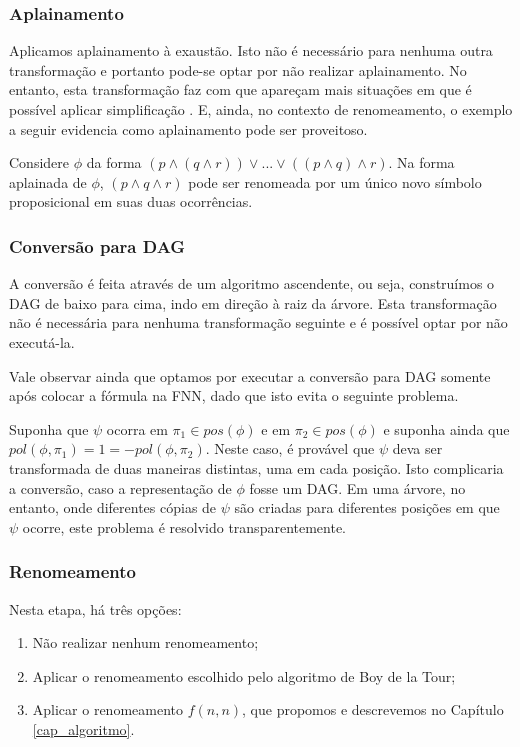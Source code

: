 \subsubsection{Aplainamento}

\indent

Aplicamos aplainamento à exaustão. Isto não é necessário para nenhuma outra transformação e portanto pode-se optar por não realizar aplainamento. No entanto, esta transformação faz com que apareçam mais situações em que é possível aplicar simplificação \cite{sebastiani2009automated}. E, ainda, no contexto de renomeamento, o exemplo a seguir evidencia como aplainamento pode ser proveitoso.

Considere $\phi$ da forma $(p \wedge (q \wedge r)) \vee ... \vee ((p \wedge q) \wedge r)$. Na forma aplainada de $\phi$, $(p \wedge q \wedge r)$ pode ser renomeada por um único novo símbolo proposicional em suas duas ocorrências.

\subsubsection{Conversão para DAG}

\indent

A conversão é feita através de um algoritmo ascendente, ou seja, construímos o DAG de baixo para cima, indo em direção à raiz da árvore. Esta transformação não é necessária para nenhuma transformação seguinte e é possível optar por não executá-la.

Vale observar ainda que optamos por executar a conversão para DAG somente após colocar a fórmula na FNN, dado que isto evita o seguinte problema.

Suponha que $\psi$ ocorra em $\pi_1 \in pos(\phi)$ e em $\pi_2 \in pos(\phi)$ e suponha ainda que $pol(\phi,\pi_1) = 1 = -pol(\phi,\pi_2)$. Neste caso, é provável que $\psi$ deva ser transformada de duas maneiras distintas, uma em cada posição. Isto complicaria a conversão, caso a representação de $\phi$ fosse um DAG. Em uma árvore, no entanto, onde diferentes cópias de $\psi$ são criadas para diferentes posições em que $\psi$ ocorre, este problema é resolvido transparentemente.

\subsubsection{Renomeamento}

\indent

Nesta etapa, há três opções:
\begin{enumerate}
	\item Não realizar nenhum renomeamento;
	\item Aplicar o renomeamento escolhido pelo algoritmo de Boy de la Tour;
	\item Aplicar o renomeamento $f(n,n)$, que propomos e descrevemos no Capítulo \ref{cap_algoritmo}.
\end{enumerate}

